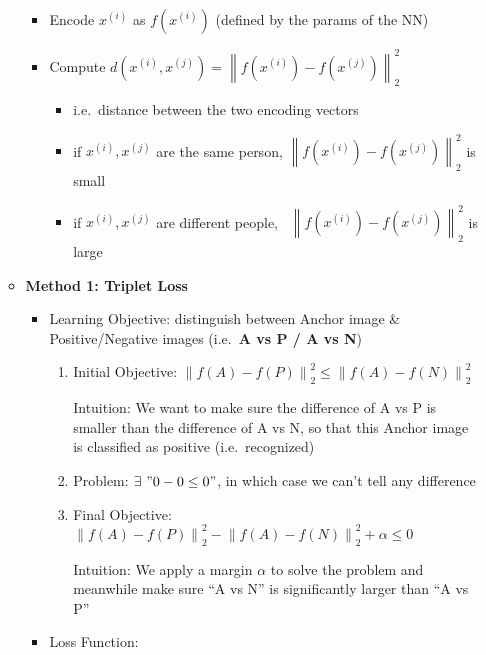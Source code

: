 \documentclass[
]{book}
\providecommand{\tightlist}{%
  \setlength{\itemsep}{0pt}\setlength{\parskip}{0pt}}
\begin{document}
\begin{itemize}
\begin{itemize}
    \begin{itemize}
    \tightlist
    \item
      Encode \(x^{(i)}\) as \(f(x^{(i)})\) (defined by the params of the
      NN)
    \item
      Compute
      \(d(x^{(i)},x^{(j)})=\left\lVert{f(x^{(i)})-f(x^{(j)})}\right\lVert_ 2^2\)

      \begin{itemize}
      \tightlist
      \item
        i.e.~distance between the two encoding vectors
      \item
        if \(x^{(i)},x^{(j)}\) are the same person,
        \(\left\lVert{f(x^{(i)})-f(x^{(j)})}\right\lVert_ 2^2\) is small
      \item
        if \(x^{(i)},x^{(j)}\) are different people,~
        \(\left\lVert{f(x^{(i)})-f(x^{(j)})}\right\lVert_ 2^2\) is
        large\\
      \end{itemize}
    \end{itemize}
  \item
    \textbf{Method 1: Triplet Loss}

    \begin{itemize}
    \item
      Learning Objective: distinguish between Anchor image \&
      Positive/Negative images (i.e.~\textbf{A vs P / A vs N})

      \begin{enumerate}
      \def\labelenumi{\arabic{enumi}.}
      \item
        Initial Objective:
        \(\left\lVert{f(A)-f(P)}\right\lVert_ 2^2 \leq \left\lVert{f(A)-f(N)}\right\lVert_ 2^2\)

        Intuition: We want to make sure the difference of A vs P is
        smaller than the difference of A vs N, so that this Anchor image
        is classified as positive (i.e.~recognized)
      \item
        Problem: \(\exists\ "0-0\leq0"\), in which case we can't tell
        any difference
      \item
        Final Objective:
        \(\left\lVert{f(A)-f(P)}\right\lVert_ 2^2-\left\lVert{f(A)-f(N)}\right\lVert_ 2^2+\alpha\leq0\)

        Intuition: We apply a margin \(\alpha\) to solve the problem and
        meanwhile make sure ``A vs N'' is significantly larger than ``A
        vs P''
      \end{enumerate}
    \item
      Loss Function:


\end{itemize}
\end{itemize}
\end{itemize}
\end{document}
